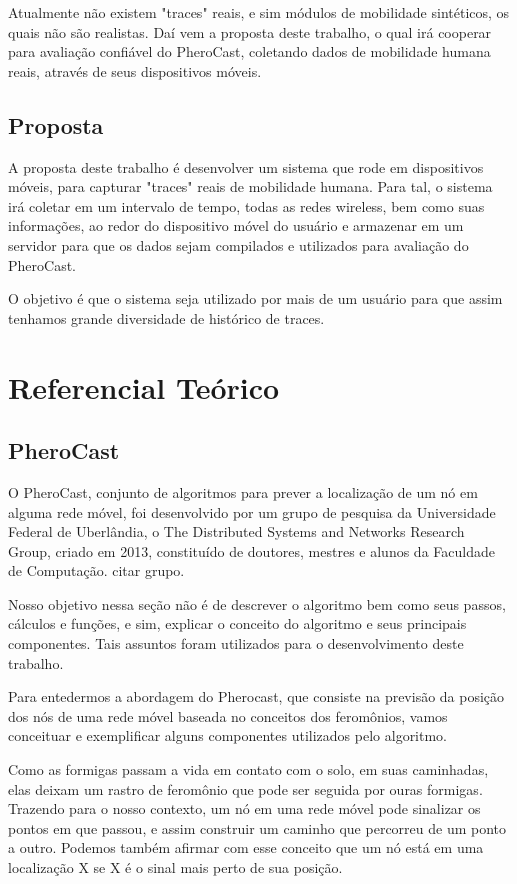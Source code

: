 \documentclass[12pt, %
openright, 
oneside,
a4paper,
brazil]{facom-ufu-abntex2}
\begin{document}
Atualmente não existem "traces" reais, e sim módulos de mobilidade sintéticos, os quais não são realistas. Daí vem a proposta deste trabalho, o qual irá cooperar para avaliação confiável do PheroCast, coletando dados de mobilidade humana reais, através de seus dispositivos móveis.
\section{Proposta}
A proposta deste trabalho é desenvolver um sistema que rode em dispositivos móveis, para capturar "traces" reais de mobilidade humana. Para tal, o sistema irá coletar em um intervalo de tempo, todas as redes wireless, bem como suas informações, ao redor do dispositivo móvel do usuário e armazenar em um servidor para que os dados sejam compilados e utilizados para avaliação do PheroCast.

O objetivo é que o sistema seja utilizado por mais de um usuário para que assim tenhamos grande diversidade de histórico de traces.

\chapter{Referencial Teórico}
\section{PheroCast}

	O PheroCast, conjunto de algoritmos para prever a localização de um nó em alguma rede móvel, foi desenvolvido por um grupo de pesquisa da Universidade Federal de Uberlândia, o The Distributed Systems and Networks  Research Group, criado em 2013, constituído de doutores, mestres e alunos da Faculdade de Computação. citar grupo. 
	
	Nosso objetivo nessa seção não é de descrever o algoritmo bem como seus passos, cálculos e funções, e sim, explicar o conceito do algoritmo e seus principais componentes. Tais assuntos foram utilizados para o desenvolvimento deste trabalho.
	
	Para entedermos a abordagem do Pherocast, que consiste na previsão da posição dos nós de uma rede móvel baseada no conceitos dos feromônios, vamos conceituar e exemplificar alguns componentes utilizados pelo algoritmo.

	Como as formigas passam a vida em contato com o solo, em suas caminhadas, elas deixam um rastro de feromônio que pode ser seguida por ouras formigas. Trazendo para o nosso contexto, um nó em uma rede móvel pode sinalizar os pontos em que passou, e assim construir um caminho que percorreu de um ponto a outro. Podemos também afirmar com esse conceito que um nó está em uma localização X se X é o sinal mais perto de sua posição.
	
\end{document}
